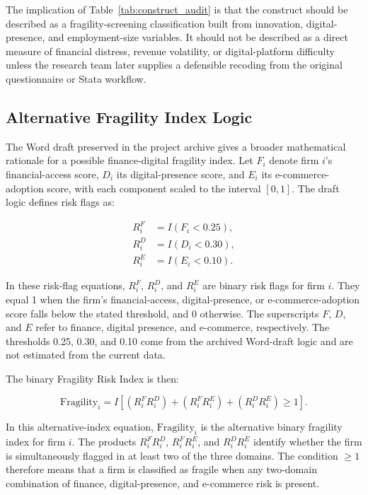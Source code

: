The implication of Table~\ref{tab:construct_audit} is that the construct should be described as a fragility-screening classification built from innovation, digital-presence, and employment-size variables. It should not be described as a direct measure of financial distress, revenue volatility, or digital-platform difficulty unless the research team later supplies a defensible recoding from the original questionnaire or Stata workflow.

\subsection{Alternative Fragility Index Logic}

The Word draft preserved in the project archive gives a broader mathematical rationale for a possible finance-digital fragility index. Let $F_i$ denote firm $i$'s financial-access score, $D_i$ its digital-presence score, and $E_i$ its e-commerce-adoption score, with each component scaled to the interval $[0,1]$. The draft logic defines risk flags as:

\begin{align}
R^{F}_i &= I(F_i < 0.25),\\
R^{D}_i &= I(D_i < 0.30),\\
R^{E}_i &= I(E_i < 0.10).
\end{align}

In these risk-flag equations, $R^{F}_i$, $R^{D}_i$, and $R^{E}_i$ are binary risk flags for firm $i$. They equal 1 when the firm's financial-access, digital-presence, or e-commerce-adoption score falls below the stated threshold, and 0 otherwise. The superscripts $F$, $D$, and $E$ refer to finance, digital presence, and e-commerce, respectively. The thresholds 0.25, 0.30, and 0.10 come from the archived Word-draft logic and are not estimated from the current data.

The binary Fragility Risk Index is then:

\begin{equation}
\text{Fragility}_i =
I\left[
(R^{F}_i R^{D}_i) + (R^{F}_i R^{E}_i) + (R^{D}_i R^{E}_i) \geq 1
\right].
\end{equation}

In this alternative-index equation, $\text{Fragility}_i$ is the alternative binary fragility index for firm $i$. The products $R^{F}_iR^{D}_i$, $R^{F}_iR^{E}_i$, and $R^{D}_iR^{E}_i$ identify whether the firm is simultaneously flagged in at least two of the three domains. The condition $\geq 1$ therefore means that a firm is classified as fragile when any two-domain combination of finance, digital-presence, and e-commerce risk is present.

